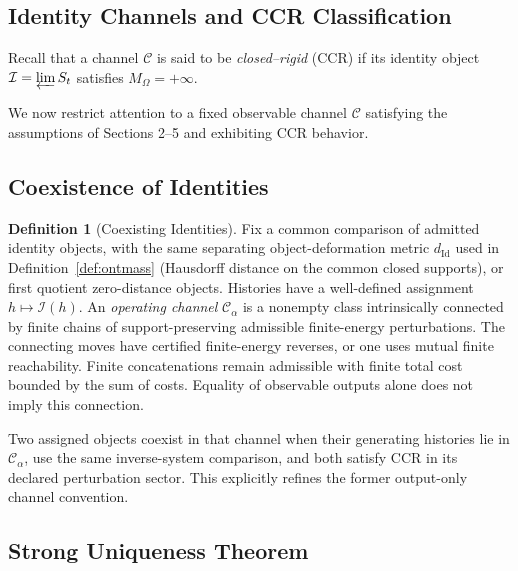\documentclass[11pt,a4paper]{article}
\theoremstyle{plain}
\theoremstyle{definition}
\newtheorem{definition}[theorem]{Definition}
\theoremstyle{remark}
\begin{document}
\subsection{Identity Channels and CCR Classification}

Recall that a channel $\mathcal{C}$ is said to be \textit{closed--rigid} (CCR) if its identity object $\mathcal{I} = \varprojlim S_t$ satisfies $M_\Omega = +\infty$.

We now restrict attention to a fixed observable channel $\mathcal{C}$ satisfying the assumptions of Sections 2--5 and exhibiting CCR behavior.

\subsection{Coexistence of Identities}

\begin{definition}[Coexisting Identities]\label{def:coexist}
Fix a common comparison of admitted identity objects, with the same separating object-deformation metric $d_{\mathrm{Id}}$ used in Definition~\ref{def:ontmass} (Hausdorff distance on the common closed supports), or first quotient zero-distance objects. Histories have a well-defined assignment $h\mapsto\mathcal I(h)$. An \emph{operating channel} $\mathcal C_\alpha$ is a nonempty class intrinsically connected by finite chains of support-preserving admissible finite-energy perturbations. The connecting moves have certified finite-energy reverses, or one uses mutual finite reachability. Finite concatenations remain admissible with finite total cost bounded by the sum of costs. Equality of observable outputs alone does not imply this connection.

Two assigned objects coexist in that channel when their generating histories lie in $\mathcal C_\alpha$, use the same inverse-system comparison, and both satisfy CCR in its declared perturbation sector. This explicitly refines the former output-only channel convention.
\end{definition}

\subsection{Strong Uniqueness Theorem}
\end{document}
